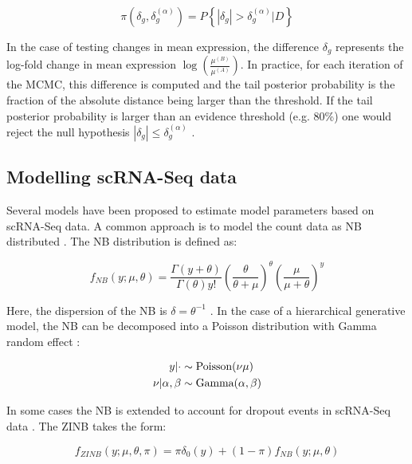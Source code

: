 \begin{equation}
\pi(\delta_g,\delta_g^{(\alpha)})=P\left\lbrace|\delta_g|>\delta_g^{(\alpha)}|D\right\rbrace
\end{equation}

In the case of testing changes in mean expression, the difference $\delta_g$ represents the log-fold change in mean expression $\log(\frac{\mu^{(B)}}{\mu^{(A)}})$. In practice, for each iteration of the MCMC, this difference is computed and the tail posterior probability is the fraction of the absolute distance being larger than the threshold. If the tail posterior probability is larger than an evidence threshold (e.g. 80\%) one would reject the null hypothesis $|\delta_g|\leq\delta_g^{(\alpha)}$ \citep{Vallejos2016}. 

\subsection{Modelling scRNA-Seq data}

Several models have been proposed to estimate model parameters based on scRNA-Seq data. A common approach is to model the count data as \gls{NB} distributed \citep{Vallejos2015BASiCS, Risso2018, Lopez2018}. The NB distribution is defined as:

\begin{equation}
f_{NB}(y;\mu,\theta)=\frac{\Gamma(y+\theta)}{\Gamma(\theta)y!}\left(\frac{\theta}{\theta + \mu}\right)^\theta\left(\frac{\mu}{\mu + \theta}\right)^y
\end{equation}

Here, the dispersion of the NB is $\delta=\theta^{-1}$ \cite{Risso2018}. In the case of a hierarchical generative model, the NB can be decomposed into a Poisson distribution with Gamma random effect \cite{Vallejos2015BASiCS}:

\begin{align*}
y|\cdot&\sim{}\textnormal{Poisson}(\nu\mu)\\
\nu|\alpha,\beta&\sim{}\textnormal{Gamma}(\alpha,\beta)
\end{align*}

In some cases \citep{Risso2018, Lopez2018} the NB is extended to account for dropout events in scRNA-Seq data \citep{Kharchenko2015}. The \gls{ZINB} takes the form:

\begin{equation}
f_{ZINB}(y;\mu,\theta,\pi)=\pi\delta_0(y) + (1-\pi)f_{NB}(y;\mu,\theta) 
\end{equation}

